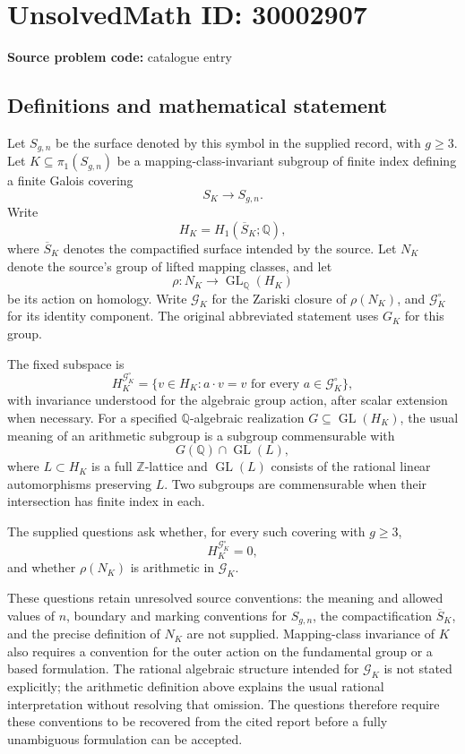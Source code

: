 \documentclass[11pt]{article}
\newcommand{\Z}{\mathbb{Z}}
\newcommand{\Q}{\mathbb{Q}}
\begin{document}
\section*{UnsolvedMath ID: 30002907}
\textbf{Source problem code:} catalogue entry
\subsection{Definitions and mathematical statement}
Let \(S_{g,n}\) be the surface denoted by this symbol in the supplied record, with \(g\geq 3\). Let \(K\subseteq\pi_1(S_{g,n})\) be a mapping-class-invariant subgroup of finite index defining a finite Galois covering
\[
S_K\longrightarrow S_{g,n}.
\]
Write
\[
H_K=H_1(\overline{S}_K;\Q),
\]
where \(\overline{S}_K\) denotes the compactified surface intended by the source. Let \(N_K\) denote the source's group of lifted mapping classes, and let
\[
\rho:N_K\longrightarrow\operatorname{GL}_{\Q}(H_K)
\]
be its action on homology. Write \(\mathcal G_K\) for the Zariski closure of \(\rho(N_K)\), and \(\mathcal G_K^\circ\) for its identity component. The original abbreviated statement uses \(G_K\) for this group.

The fixed subspace is
\[
H_K^{\mathcal G_K^\circ}
=\{v\in H_K: a\cdot v=v\text{ for every }a\in\mathcal G_K^\circ\},
\]
with invariance understood for the algebraic group action, after scalar extension when necessary. For a specified \(\Q\)-algebraic realization \(G\subseteq\operatorname{GL}(H_K)\), the usual meaning of an arithmetic subgroup is a subgroup commensurable with
\[
G(\Q)\cap\operatorname{GL}(L),
\]
where \(L\subset H_K\) is a full \(\Z\)-lattice and \(\operatorname{GL}(L)\) consists of the rational linear automorphisms preserving \(L\). Two subgroups are commensurable when their intersection has finite index in each.

The supplied questions ask whether, for every such covering with \(g\geq3\),
\[
H_K^{\mathcal G_K^\circ}=0,
\]
and whether \(\rho(N_K)\) is arithmetic in \(\mathcal G_K\).

These questions retain unresolved source conventions: the meaning and allowed values of \(n\), boundary and marking conventions for \(S_{g,n}\), the compactification \(\overline{S}_K\), and the precise definition of \(N_K\) are not supplied. Mapping-class invariance of \(K\) also requires a convention for the outer action on the fundamental group or a based formulation. The rational algebraic structure intended for \(\mathcal G_K\) is not stated explicitly; the arithmetic definition above explains the usual rational interpretation without resolving that omission. The questions therefore require these conventions to be recovered from the cited report before a fully unambiguous formulation can be accepted.
\end{document}
